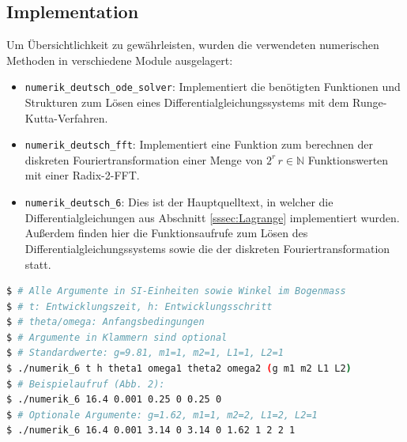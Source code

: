 \documentclass[10pt,a4paper]{article}
\begin{document}
\subsection{Implementation}
Um Übersichtlichkeit zu gewährleisten, wurden die verwendeten numerischen Methoden in verschiedene Module ausgelagert:
\begin{itemize}
  \item \texttt{numerik\_deutsch\_ode\_solver}: Implementiert die benötigten Funktionen und Strukturen zum Lösen eines Differentialgleichungssystems mit dem Runge-Kutta-Verfahren.
  \item \texttt{numerik\_deutsch\_fft}: Implementiert eine Funktion zum berechnen der diskreten Fouriertransformation einer Menge von $2^r\,r\in \mathbb{N}$ Funktionswerten mit einer Radix-2-FFT.
  \item \texttt{numerik\_deutsch\_6}: Dies ist der Hauptquelltext, in welcher die Differentialgleichungen aus Abschnitt \ref{sssec:Lagrange} implementiert wurden. Außerdem finden hier die Funktionsaufrufe zum Lösen des Differentialgleichungssystems sowie die der diskreten Fouriertransformation statt.
\end{itemize}

\begin{lstlisting}[language=bash, caption={Programmaufruf}]
$ # Alle Argumente in SI-Einheiten sowie Winkel im Bogenmass
$ # t: Entwicklungszeit, h: Entwicklungsschritt
$ # theta/omega: Anfangsbedingungen
$ # Argumente in Klammern sind optional
$ # Standardwerte: g=9.81, m1=1, m2=1, L1=1, L2=1
$ ./numerik_6 t h theta1 omega1 theta2 omega2 (g m1 m2 L1 L2)
$ # Beispielaufruf (Abb. 2):
$ ./numerik_6 16.4 0.001 0.25 0 0.25 0
$ # Optionale Argumente: g=1.62, m1=1, m2=2, L1=2, L2=1
$ ./numerik_6 16.4 0.001 3.14 0 3.14 0 1.62 1 2 2 1
\end{lstlisting}
\end{document}

